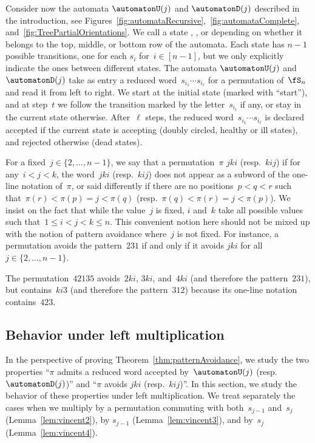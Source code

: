 Consider now the automata $\automatonU(j)$ and $\automatonD(j)$ described in the introduction, see Figures~\ref{fig:automataRecursive},~\ref{fig:automataComplete}, and~\ref{fig:TreePartialOrientations}.
We call a state , , or  depending on whether it belongs to the top, middle, or bottom row of the automata.
Each state has $n-1$ possible transitions, one for each $s_i$ for~$i \in [n-1]$, but we only explicitly indicate the ones between different states.
The automata $\automatonU(j)$ and $\automatonD(j)$ take as entry a reduced word~$s_{i_1} \cdots s_{i_\ell}$ for a permutation of~$\fS_n$ and read it from left to right.
We start at the initial state (marked with ``start''), and at step~$t$ we follow the transition marked by the letter~$s_{i_t}$ if any, or stay in the current state otherwise.
After~$\ell$ steps, the reduced word~$s_{i_1} \cdots s_{i_\ell}$ is declared accepted if the current state is accepting (doubly circled, healthy or ill states), and rejected otherwise (dead states).

For a fixed~$j \in \{2, \dots, n-1\}$, we say that a permutation~$\pi$  $jki$ (resp.~$kij$) if for any~$i < j < k$, the word~$jki$ (resp.~$kij$) does not appear as a subword of the one-line notation of~$\pi$, or said differently if there are no positions~$p < q < r$ such that~$\pi(r) < \pi(p) = j < \pi(q)$ (resp.~$\pi(q) < \pi(r) = j < \pi(p)$).
We insist on the fact that while the value~$j$ is fixed, $i$ and~$k$ take all possible values such that~$1 \le i < j < k \le n$.
This convenient notion here should not be mixed up with the notion of pattern avoidance where~$j$ is not fixed.
For instance, a permutation avoids the pattern~$231$ if and only if it avoids $jki$ for all~$j \in \{2, \dots, n-1\}$.

\begin{example}\label{exm:patternAvoidance}
	The permutation~$42135$ avoids~$2ki$, $3ki$, and~$4ki$ (and therefore the pattern~$231$), but contains~$ki3$ (and therefore the pattern~$312$) because its one-line notation contains~$423$. 
\end{example}

\subsection{Behavior under left multiplication}

In the perspective of proving Theorem~\ref{thm:patternAvoidance}, we study the two properties ``$\pi$ admits a reduced word accepted by~$\automatonU(j)$ (resp.~$\automatonD(j)$)'' and ``$\pi$ avoids $jki$ (resp.~$kij$)''.
In this section, we study the behavior of these properties under left multiplication.
We treat separately the cases when we multiply by a permutation commuting with both~$s_{j-1}$ and~$s_j$ (Lemma~\ref{lem:vincent2}), by $s_{j-1}$ (Lemma~\ref{lem:vincent3}), and by~$s_j$ (Lemma~\ref{lem:vincent4}).

